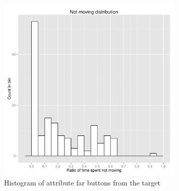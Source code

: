 \begin{figure}[!htbp]
  \centering
	\includegraphics[page=9,width=0.8\textwidth]{Images/chains_features_ML}
	\caption{Histogram of attribute far buttons from the target}
	\label{fig:chains-distrib-far}
\end{figure}